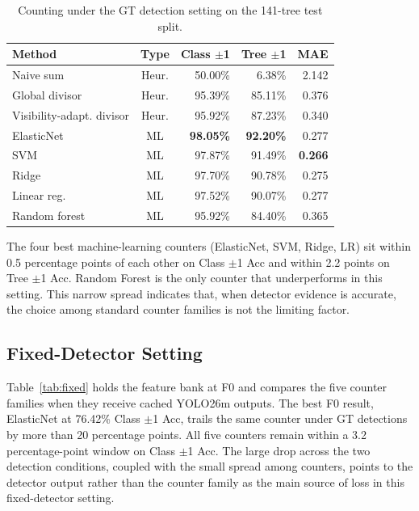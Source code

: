 \documentclass[conference]{IEEEtran}
\begin{document}
\begin{table}[!htbp]
  \centering
  \scriptsize
  \setlength{\tabcolsep}{2.3pt}
  \caption{Counting under the GT detection setting on the 141-tree test split.}
  \label{tab:gt}
  \begin{tabular}{@{}lcrrr@{}}
    \toprule
    Method                      & Type  & Class $\pm$1 & Tree $\pm$1 & MAE            \\
    \midrule
    Naive sum                   & Heur. & 50.00\%          &  6.38\%     & 2.142          \\
    Global divisor              & Heur. & 95.39\%          & 85.11\%     & 0.376          \\
    Visibility-adapt. divisor   & Heur. & 95.92\%          & 87.23\%     & 0.340          \\
    ElasticNet                  & ML    & \textbf{98.05\%} & \textbf{92.20\%} & 0.277      \\
    SVM                         & ML    & 97.87\%          & 91.49\%     & \textbf{0.266} \\
    Ridge                       & ML    & 97.70\%          & 90.78\%     & 0.275          \\
    Linear reg.                 & ML    & 97.52\%          & 90.07\%     & 0.277          \\
    Random forest               & ML    & 95.92\%          & 84.40\%     & 0.365          \\
    \bottomrule
  \end{tabular}
\end{table}

The four best machine-learning counters (ElasticNet, SVM, Ridge, LR) sit within
0.5 percentage points of each other on Class $\pm$1 Acc and within 2.2 points
on Tree $\pm$1 Acc. Random Forest is the only counter that underperforms in this
setting. This narrow spread indicates that, when detector evidence is accurate,
the choice among standard counter families is not the limiting factor.

\subsection{Fixed-Detector Setting}
\label{sec:fixed}

Table~\ref{tab:fixed} holds the feature bank at F0 and compares the five
counter families when they receive cached YOLO26m outputs. The best F0 result,
ElasticNet at 76.42\% Class $\pm$1 Acc, trails the same counter under GT
detections by more than 20 percentage points. All five counters remain within a
3.2 percentage-point window on Class $\pm$1 Acc. The large drop across the two
detection conditions, coupled with the small spread among counters, points to
the detector output rather than the counter family as the main source of loss in
this fixed-detector setting.
\end{document}
